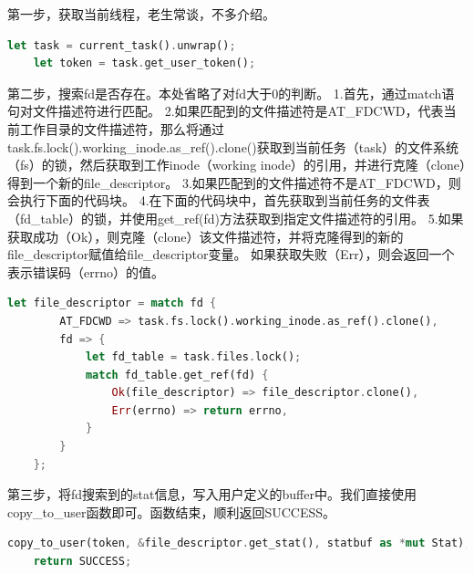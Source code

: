 第一步，获取当前线程，老生常谈，不多介绍。
\begin{lstlisting}[language={Rust}, 
	caption={获取线程}]
    let task = current_task().unwrap();
    let token = task.get_user_token();
\end{lstlisting}
第二步，搜索fd是否存在。本处省略了对fd大于0的判断。
1.首先，通过match语句对文件描述符进行匹配。
2.如果匹配到的文件描述符是AT_FDCWD，代表当前工作目录的文件描述符，那么将通过task.fs.lock().working_inode.as_ref().clone()获取到当前任务（task）的文件系统（fs）的锁，然后获取到工作inode（working inode）的引用，并进行克隆（clone）得到一个新的file_descriptor。
3.如果匹配到的文件描述符不是AT_FDCWD，则会执行下面的代码块。
4.在下面的代码块中，首先获取到当前任务的文件表（fd_table）的锁，并使用get_ref(fd)方法获取到指定文件描述符的引用。
5.如果获取成功（Ok），则克隆（clone）该文件描述符，并将克隆得到的新的file_descriptor赋值给file_descriptor变量。
如果获取失败（Err），则会返回一个表示错误码（errno）的值。
\begin{lstlisting}[language={Rust}, 
	caption={fd查找}]
    let file_descriptor = match fd {
        AT_FDCWD => task.fs.lock().working_inode.as_ref().clone(),
        fd => {
            let fd_table = task.files.lock();
            match fd_table.get_ref(fd) {
                Ok(file_descriptor) => file_descriptor.clone(),
                Err(errno) => return errno,
            }
        }
    };
\end{lstlisting}
第三步，将fd搜索到的stat信息，写入用户定义的buffer中。我们直接使用copy_to_user函数即可。函数结束，顺利返回SUCCESS。
\begin{lstlisting}[language={Rust}, 
	caption={赋值stat~buffer}]
    copy_to_user(token, &file_descriptor.get_stat(), statbuf as *mut Stat);
    return SUCCESS;
\end{lstlisting}
